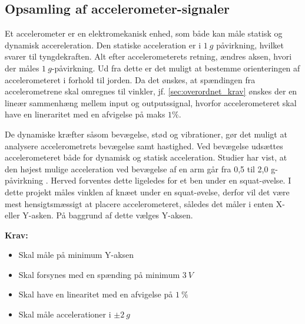 \subsection{Opsamling af accelerometer-signaler} \label{sec:acc_teori}
Et accelerometer er en elektromekanisk enhed, som både kan måle statisk og dynamisk accereleration. Den statiske acceleration er i $1~g$ påvirkning, hvilket svarer til tyngdekraften. Alt efter accelerometerets retning, ændres aksen, hvori der måles $1~g$-påvirkning. Ud fra dette er det muligt at bestemme orienteringen af accelerometeret i forhold til jorden. Da det ønskes, at spændingen fra accelerometrene skal omregnes til vinkler, jf. \autoref{sec:overordnet_krav} ønskes der en lineær sammenhæng mellem input og outputssignal, hvorfor accelerometeret skal have en lineraritet med en afvigelse på maks $1\%$. 

De dynamiske kræfter såsom bevægelse, stød og vibrationer, gør det muligt at analysere accelerometrets bevægelse samt hastighed. Ved bevægelse udsættes accelerometeret både for dynamisk og statisk acceleration. Studier har vist, at den højest mulige acceleration ved bevægelse af en arm går fra 0,5 til 2,0 g-påvirkning \citep{bernmarka2002}. Herved forventes dette ligeledes for et ben under en squat-øvelse. I dette projekt måles vinklen af knæet under en squat-øvelse, derfor vil det være mest hensigtsmæssigt at placere accelerometeret, således det måler i enten X- eller Y-asken. På baggrund af dette vælges Y-aksen.

\vspace{3mm}

\textbf{Krav:}
\begin{itemize}
\item Skal måle på minimum Y-aksen
\item Skal forsynes med en spænding på minimum $3~V$
\item Skal have en linearitet med en afvigelse på $1~\%$
\item Skal måle accelerationer i $\pm 2~g$
\end{itemize}